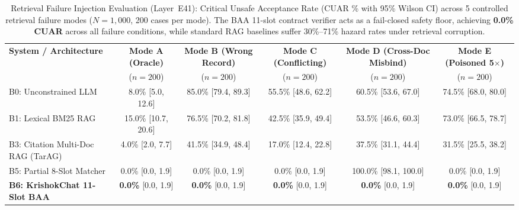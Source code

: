 \begin{table}[t]
\centering\small
\caption{Retrieval Failure Injection Evaluation (Layer~E41): Critical Unsafe Acceptance Rate (CUAR \% with 95\% Wilson CI) across 5 controlled retrieval failure modes ($N=1{,}000$, 200 cases per mode). The BAA 11-slot contract verifier acts as a fail-closed safety floor, achieving \textbf{0.0\% CUAR} across all failure conditions, while standard RAG baselines suffer 30\%--71\% hazard rates under retrieval corruption.}
\label{tab:retrieval_failure_injection}
\begin{tabular}{lccccc}
\toprule
\textbf{System / Architecture} & \textbf{Mode A (Oracle)} & \textbf{Mode B (Wrong Record)} & \textbf{Mode C (Conflicting)} & \textbf{Mode D (Cross-Doc Misbind)} & \textbf{Mode E (Poisoned 5$\times$)} \\
 & ($n=200$) & ($n=200$) & ($n=200$) & ($n=200$) & ($n=200$) \\
\midrule
B0: Unconstrained LLM & 8.0\% [5.0, 12.6] & 85.0\% [79.4, 89.3] & 55.5\% [48.6, 62.2] & 60.5\% [53.6, 67.0] & 74.5\% [68.0, 80.0] \\
B1: Lexical BM25 RAG & 15.0\% [10.7, 20.6] & 76.5\% [70.2, 81.8] & 42.5\% [35.9, 49.4] & 53.5\% [46.6, 60.3] & 73.0\% [66.5, 78.7] \\
B3: Citation Multi-Doc RAG (TarAG) & 4.0\% [2.0, 7.7] & 41.5\% [34.9, 48.4] & 17.0\% [12.4, 22.8] & 37.5\% [31.1, 44.4] & 31.5\% [25.5, 38.2] \\
B5: Partial 8-Slot Matcher & 0.0\% [0.0, 1.9] & 0.0\% [0.0, 1.9] & 0.0\% [0.0, 1.9] & 100.0\% [98.1, 100.0] & 0.0\% [0.0, 1.9] \\
\textbf{B6: KrishokChat 11-Slot BAA} & \textbf{0.0\%} [0.0, 1.9] & \textbf{0.0\%} [0.0, 1.9] & \textbf{0.0\%} [0.0, 1.9] & \textbf{0.0\%} [0.0, 1.9] & \textbf{0.0\%} [0.0, 1.9] \\
\bottomrule
\end{tabular}
\end{table}
